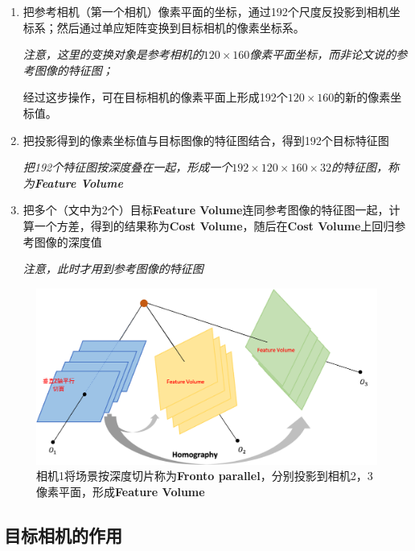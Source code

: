 	\begin{enumerate}
		\item 把参考相机（第一个相机）像素平面的坐标，通过192个尺度反投影到相机坐标系；然后通过单应矩阵变换到目标相机的像素坐标系。

		\small\textit{ 注意，这里的变换对象是参考相机的$120 \times 160$像素平面坐标，而非论文说的参考图像的特征图；}

		经过这步操作，可在目标相机的像素平面上形成192个$120 \times 160$的新的像素坐标值。

		\item 把投影得到的像素坐标值与目标图像的特征图结合，得到192个目标特征图

		\small\textit{把192个特征图按深度叠在一起，形成一个$192 \times 120 \times 160 \times 32$的特征图，称为\textbf{Feature Volume}}

		\item 把多个（文中为2个）目标\textbf{Feature Volume}连同参考图像的特征图一起，计算一个方差，得到的结果称为\textbf{Cost Volume}，随后在\textbf{Cost Volume}上回归参考图像的深度值

		\small\textit{注意，此时才用到参考图像的特征图}
	\end{enumerate}

	\begin{figure}[H]
		\begin{center}
			\includegraphics[width=\textwidth]{images/fronto.png}
		\end{center}
		\caption{相机1将场景按深度切片称为\textbf{Fronto parallel}，分别投影到相机2，3像素平面，形成\textbf{Feature Volume}}
	\end{figure}

\subsection{目标相机的作用}

